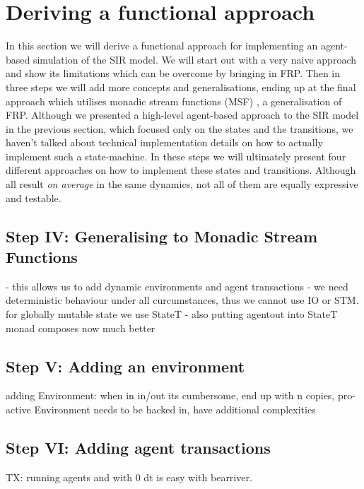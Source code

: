 \section{Deriving a functional approach}

In this section we will derive a functional approach for implementing an agent-based simulation of the SIR model. We will start out with a very naive approach and show its limitations which can be overcome by bringing in FRP. Then in three steps we will add more concepts and generalisations, ending up at the final approach which utilises monadic stream functions (MSF) \cite{perez_functional_2016}, a generalisation of FRP.
Although we presented a high-level agent-based approach to the SIR model in the previous section, which focused only on the states and the transitions, we haven't talked about technical implementation details on how to actually implement such a state-machine. In these steps we will ultimately present four different approaches on how to implement these states and transitions. Although all result \textit{on average} in the same dynamics, not all of them are equally expressive and testable.







\subsection{Step IV: Generalising to Monadic Stream Functions}
- this allows us to add dynamic environments and agent transactions
- we need deterministic behaviour under all curcumstances, thus we cannot use IO or STM. for globally mutable state we use StateT
- also putting agentout into StateT monad composes now much better

\subsection{Step V: Adding an environment}
adding Environment: when in in/out its cumbersome, end up with n copies, pro-active Environment needs to be hacked in, have additional complexities
 
\subsection{Step VI: Adding agent transactions}
TX: running agents and with 0 dt is easy with bearriver.